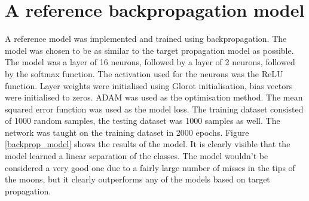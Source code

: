 \section{A reference backpropagation model}
A reference model was implemented and trained using backpropagation. The model was chosen to be as similar to the target propagation model as possible. The model was a layer of 16 neurons, followed by a layer of 2 neurons, followed by the softmax function. The activation used for the neurons was the ReLU function. Layer weights were initialised using Glorot initialisation, bias vectors were initialised to zeros. ADAM was used as the optimisation method. The mean squared error function was used as the model loss. The training dataset consisted of 1000 random samples, the testing dataset was 1000 samples as well. The network was taught on the training dataset in 2000 epochs. Figure \ref{backprop_model} shows the results of the model. It is clearly visible that the model learned a linear separation of the classes. The model wouldn't be considered a very good one due to a fairly large number of misses in the tips of the moons, but it clearly outperforms any of the models based on target propagation.

